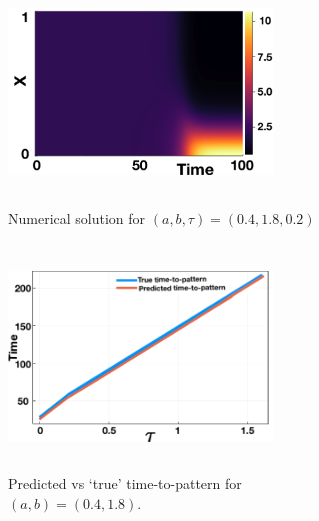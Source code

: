 \begin{figure}[H]
    \centering
    \begin{subfigure}[b]{0.45\textwidth}
        \centering
        \includegraphics[width=7cm,height=6cm]{dispnumsim.png}
        \caption{Numerical solution for $(a,b,\tau)=(0.4,1.8,0.2)$}
        \label{fig:dispnumsim}
    \end{subfigure}
    \hfill
    \begin{subfigure}[b]{0.45\textwidth}
        \centering
        \includegraphics[width=7cm,height=6cm]{ttp1.png}
        \caption{Predicted vs `true' time-to-pattern for $(a,b)=(0.4,1.8)$.}
        \label{fig:ttp1}
    \end{subfigure}
    \caption{}
    \label{}
\end{figure}


